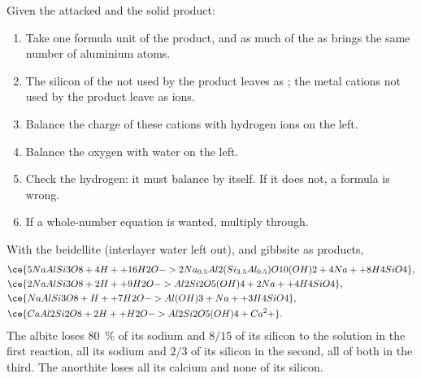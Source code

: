 \begin{method}\label{met:b1:weathering-clays:balance}
Given the  attacked and the solid product:
\begin{enumerate}
  \item Take one formula unit of the product, and as much of the  as
        brings the same number of aluminium atoms.
  \item The silicon of the  not used by the product leaves as
        ; the metal cations not used by the product leave as ions.
  \item Balance the charge of these cations with hydrogen ions on the left.
  \item Balance the oxygen with water on the left.
  \item Check the hydrogen: it must balance by itself. If it does not, a
        formula is wrong.
  \item If a whole-number equation is wanted, multiply through.
\end{enumerate}
\end{method}

\begin{proposition}\label{prop:b1:weathering-clays:feldspars}
With the  beidellite 
(interlayer water left out),   and gibbsite
 as products,
\begin{align*}
&\ce{5 NaAlSi3O8 + 4 H+ + 16 H2O -> 2 Na_{0.5}Al2(Si_{3.5}Al_{0.5})O10(OH)2 + 4 Na+ + 8 H4SiO4},\\ %
&\ce{2 NaAlSi3O8 + 2 H+ + 9 H2O -> Al2Si2O5(OH)4 + 2 Na+ + 4 H4SiO4},\\
&\ce{NaAlSi3O8 + H+ + 7 H2O -> Al(OH)3 + Na+ + 3 H4SiO4},\\
&\ce{CaAl2Si2O8 + 2 H+ + H2O -> Al2Si2O5(OH)4 + Ca^2+}.
\end{align*}
The albite loses \qty{80}{\percent} of its sodium and $8/15$ of its silicon to
the solution in the first reaction, all its sodium and $2/3$ of its silicon in
the second, all of both in the third. The anorthite loses all its calcium and
none of its silicon.
\end{proposition}

